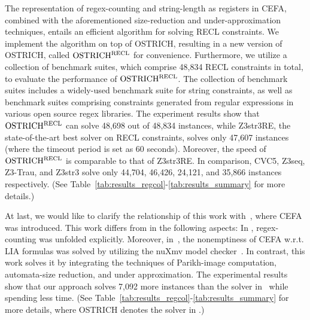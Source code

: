 The representation of regex-counting and string-length as registers in CEFA, combined with the aforementioned size-reduction and under-approximation techniques, entails an efficient algorithm for solving RECL constraints. We implement the algorithm on top of OSTRICH, resulting in a new version of OSTRICH, called $\rm OSTRICH^{RECL}$ for convenience. 
%
Furthermore, we utilize a collection of benchmark suites, which comprise 48,834 RECL constraints in total, to evaluate the performance of $\rm OSTRICH^{RECL}$. The collection of benchmark suites includes a widely-used benchmark suite for string constraints, as well as benchmark suites comprising constraints generated from regular expressions in various open source regex libraries. 
%
%
The experiment results show that $\rm OSTRICH^{RECL}$ can solve 48,698 out of 48,834 instances, while Z3str3RE, the state-of-the-art best solver on RECL constraints, solves only 47,607 instances (where the timeout period is set as 60 seconds). Moreover, the speed of $\rm OSTRICH^{RECL}$ is comparable to that of Z3str3RE. In comparison, CVC5, Z3seq, Z3-Trau, and Z3str3 solve only 44,704, 46,426, 24,121, and 35,866 instances respectively. (See Table~\ref{tab:results_regcol}-\ref{tab:results_summary} for more details.)

At last, we would like to clarify the relationship of this work with~\cite{atva2020}, where CEFA was introduced. This work differs from \cite{atva2020} in the following aspects: In \cite{atva2020}, regex-counting was unfolded explicitly. Moreover, in~\cite{atva2020}, the nonemptiness of CEFA w.r.t. LIA formulas was solved by utilizing the nuXmv model checker~\cite{nuxmv}. In contrast, this work solves it by integrating the techniques of Parikh-image computation, automata-size reduction, and under approximation. The experimental results show that our approach solves 7,092 more instances than the solver in~\cite{atva2020} while spending less time. (See Table~\ref{tab:results_regcol}-\ref{tab:results_summary} for more details, where OSTRICH denotes the solver in \cite{atva2020}.)

